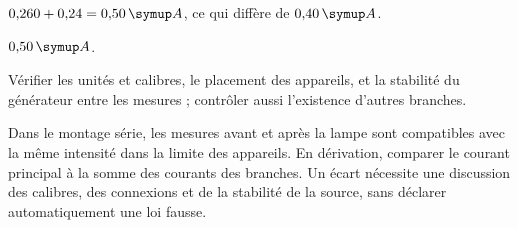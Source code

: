 \par\noindent\begin{minipage}{\linewidth}
\label{cor-defi-14}\begin{questions}
\item $0{,}260+0{,}24=0{,}50\unite A$, ce qui diffère de $0{,}40\unite A$.
\item $0{,}50\unite A$.
\item Vérifier les unités et calibres, le placement des appareils, et la stabilité du générateur entre les mesures ; contrôler aussi l’existence d’autres branches.
\end{questions}
\end{minipage}
\par\noindent\begin{minipage}{\linewidth}
\label{cor-activite-14}
Dans le montage série, les mesures avant et après la lampe sont compatibles avec la même intensité dans la limite des appareils. En dérivation, comparer le courant principal à la somme des courants des branches. Un écart nécessite une discussion des calibres, des connexions et de la stabilité de la source, sans déclarer automatiquement une loi fausse.\par\end{minipage}
